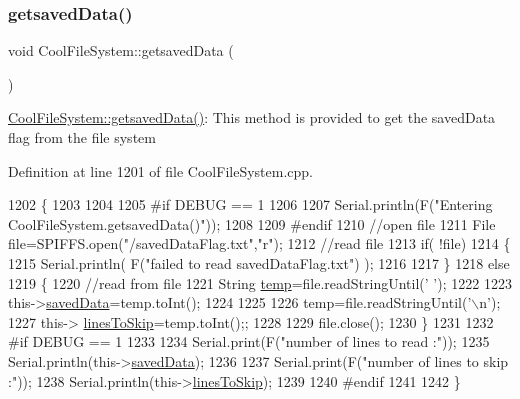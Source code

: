 \subsubsection{\texorpdfstring{getsaved\+Data()}{getsavedData()}}
{\footnotesize\ttfamily void Cool\+File\+System\+::getsaved\+Data (\begin{DoxyParamCaption}{ }\end{DoxyParamCaption})}

\hyperlink{class_cool_file_system_a70701d05e811604af1b531f4f6dc69ed}{Cool\+File\+System\+::getsaved\+Data()}\+: This method is provided to get the saved\+Data flag from the file system 

Definition at line 1201 of file Cool\+File\+System.\+cpp.


\begin{DoxyCode}
1202 \{
1203 
1204 
1205 \textcolor{preprocessor}{#if DEBUG == 1}
1206     
1207     Serial.println(F(\textcolor{stringliteral}{"Entering CoolFileSystem.getsavedData()"}));    
1208     
1209 \textcolor{preprocessor}{#endif}
1210     \textcolor{comment}{//open file}
1211     File file=SPIFFS.open(\textcolor{stringliteral}{"/savedDataFlag.txt"},\textcolor{stringliteral}{"r"});    
1212     \textcolor{comment}{//read file}
1213     \textcolor{keywordflow}{if}( !file)  
1214     \{
1215         Serial.println( F(\textcolor{stringliteral}{"failed to read savedDataFlag.txt"}) );
1216         
1217     \}
1218     \textcolor{keywordflow}{else}
1219     \{       
1220         \textcolor{comment}{//read from file    }
1221         String \hyperlink{_irene3000_8h_a5905d48604152cf57aa6bfa087b49173}{temp}=file.readStringUntil(\textcolor{charliteral}{' '});
1222         
1223         this->\hyperlink{class_cool_file_system_ad9f5b739a32100f5f21270c3d9ee2b1d}{savedData}=temp.toInt();
1224 
1225         
1226         temp=file.readStringUntil(\textcolor{charliteral}{'\(\backslash\)n'});
1227         this-> \hyperlink{class_cool_file_system_a84fdb6057e534b395512463daa28ea3c}{linesToSkip}=temp.toInt();;    
1228         
1229         file.close();   
1230     \}
1231     
1232 \textcolor{preprocessor}{#if DEBUG == 1}
1233 
1234     Serial.print(F(\textcolor{stringliteral}{"number of lines to read :"}));
1235     Serial.println(this->\hyperlink{class_cool_file_system_ad9f5b739a32100f5f21270c3d9ee2b1d}{savedData});
1236     
1237     Serial.print(F(\textcolor{stringliteral}{"number of lines to skip :"}));
1238     Serial.println(this->\hyperlink{class_cool_file_system_a84fdb6057e534b395512463daa28ea3c}{linesToSkip});
1239 
1240 \textcolor{preprocessor}{#endif}
1241     
1242 \}
\end{DoxyCode}
